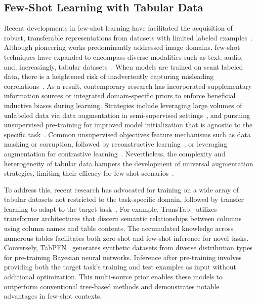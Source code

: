 \subsection{Few-Shot Learning with Tabular Data} Recent developments in few-shot learning have facilitated the acquisition of robust, transferable representations from datasets with limited labeled examples~\cite{chen2018closer}. Although pioneering works predominantly addressed image domains, few-shot techniques have expanded to encompass diverse modalities such as text, audio, and, increasingly, tabular datasets~\cite{majumder2022few,nam2023stunt,schick2021exploiting}. When models are trained on scant labeled data, there is a heightened risk of inadvertently capturing misleading correlations~\cite{bartlett2021deep}. As a result, contemporary research has incorporated supplementary information sources or integrated domain-specific priors to enforce beneficial inductive biases during learning. Strategies include leveraging large volumes of unlabeled data via data augmentation in semi-supervised settings~\cite{ucar2021subtab,yoon2020vime}, and pursuing unsupervised pre-training for improved model initialization that is agnostic to the specific task~\cite{somepalli2021saint}. Common unsupervised objectives feature mechanisms such as data masking or corruption, followed by reconstructive learning~\cite{arik2021tabnet,majmundar2022met}, or leveraging augmentation for contrastive learning~\cite{bahri2022scarf,chen2020simple}. Nevertheless, the complexity and heterogeneity of tabular data hampers the development of universal augmentation strategies, limiting their efficacy for few-shot scenarios~\cite{nam2023stunt}. 

To address this, recent research has advocated for training on a wide array of tabular datasets not restricted to the task-specific domain, followed by transfer learning to adapt to the target task~\cite{zhang2023generative,levin2022transfer,zhu2023xtab}. For example, TransTab~\cite{wang2022transtab} utilizes transformer architectures that discern semantic relationships between columns using column names and table contents. The accumulated knowledge across numerous tables facilitates both zero-shot and few-shot inference for novel tasks. Conversely, TabPFN~\cite{hollmann2022tabpfn} generates synthetic datasets from diverse distribution types for pre-training Bayesian neural networks. Inference after pre-training involves providing both the target task’s training and test examples as input without additional optimization. This multi-source prior enables these models to outperform conventional tree-based methods and demonstrates notable advantages in few-shot contexts.

